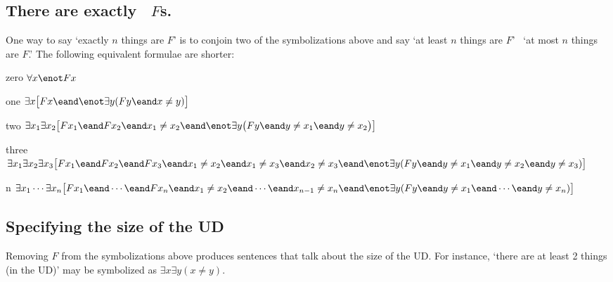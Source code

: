 \subsection*{There are exactly \blank\ $F$s.}
\label{summary.exactly}

One way to say `exactly $n$ things are $F$' is to conjoin two of the symbolizations above and say `at least $n$ things are $F$' \eand\ `at most $n$ things are $F$.' The following equivalent formulae are shorter:
\begin{ekey}
\item[zero] $\forall x\enot Fx$
\item[one] $\exists x\bigl[Fx \eand \enot\exists y(Fy \eand x\neq y)\bigr]$
\item[two] $\exists x_1\exists x_2\bigl[Fx_1 \eand Fx_2 \eand x_1 \neq x_2 \eand \enot\exists y\bigl(Fy \eand y\neq x_1 \eand y \neq x_2\bigr) \bigr]$
\item[three] $\exists x_1\exists x_2\exists x_3\bigl[Fx_1 \eand Fx_2 \eand Fx_3 \eand x_1 \neq x_2 \eand x_1 \neq x_3 \eand x_2 \neq x_3 \eand\\
\enot\exists y(Fy \eand y \neq x_1 \eand y \neq x_2 \eand y\neq x_3) \bigr]$
\item[n] $\exists x_1\cdots\exists x_n\bigl[Fx_1 \eand\cdots\eand Fx_n  \eand x_1 \neq x_2 \eand\cdots\eand x_{n-1}\neq x_n \eand\\
 \enot\exists y(Fy \eand y\neq x_1 \eand \cdots \eand y\neq x_n)\bigr]$ 
\end{ekey}

\subsection*{Specifying the size of the UD}

Removing $F$ from the symbolizations above produces sentences that talk about the size of the UD. For instance, `there are at least 2 things (in the UD)' may be symbolized as $\exists x\exists y(x \neq y)$.


